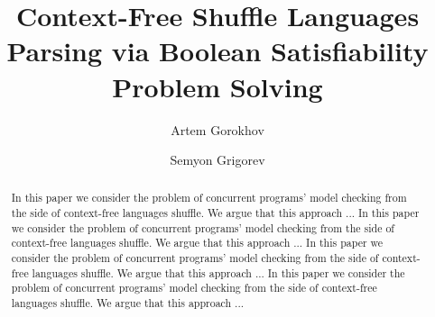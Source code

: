 \documentclass[sigconf]{acmart}
\begin{document}
\title{Context-Free Shuffle Languages Parsing via Boolean Satisfiability Problem Solving}


\author{Artem Gorokhov}

\author{Semyon Grigorev}



\begin{abstract}
    In this paper we consider the problem of concurrent programs' model checking from the side 
    of context-free languages shuffle. We argue that this approach ...
        In this paper we consider the problem of concurrent programs' model checking from the side 
    of context-free languages shuffle. We argue that this approach ...
       In this paper we consider the problem of concurrent programs' model checking from the side 
    of context-free languages shuffle. We argue that this approach ...
       In this paper we consider the problem of concurrent programs' model checking from the side 
    of context-free languages shuffle. We argue that this approach ...
\end{abstract}

%
%



\maketitle





\end{document}
